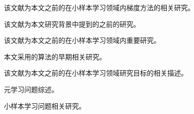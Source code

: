 \cite{schmidhuber1987evolutionary} 该文献为本文之前的在小样本学习领域内梯度方法的相关研究。

\cite{schmidt2014shrinkage}  该文献为本文研究背景中提到的之前的研究。

\cite{snell2017prototypical} 该文献为本文之前的在小样本学习领域内重要研究。

\cite{tappen2007learning} 本文采用的算法的早期相关研究。

\cite{thrun1998lifelong} 该文献为本文之前的在小样本学习领域研究目标的相关描述。

\cite{vilalta2002perspective} 元学习问题综述。

\cite{vinyals2016matching} 小样本学习问题相关研究。